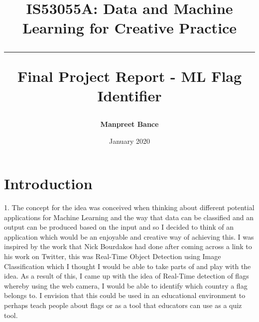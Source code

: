 \documentclass{report}
\title{\textbf{IS53055A: Data and Machine Learning for Creative Practice} \vspace{0.5cm} \hrule \vspace{0.5cm} Final Project Report - ML Flag Identifier}
\date{January 2020}
\author{\textbf{Manpreet Bance}}
\begin{document}
\maketitle


\section*{Introduction}
1. The concept for the idea was conceived when thinking about different potential applications for Machine Learning and the way that data can be classified and an output can be produced based on the input and so I decided to think of an application which would be an enjoyable and creative way of achieving this. I was inspired by the work that Nick Bourdakos had done after coming across a link to his work on Twitter, this was Real-Time Object Detection using Image Classification which I thought I would be able to take parts of and play with the idea. As a result of this, I came up with the idea of Real-Time detection of flags whereby using the web camera, I would be able to identify which country a flag belongs to. I envision that this could be used in an educational environment to perhaps teach people about flags or as a tool that educators can use as a quiz tool.
\end{document}
